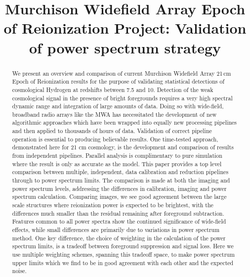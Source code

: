 \documentclass[twolcolumn,iop]{emulateapj}
\begin{document}

\title{Murchison Widefield Array Epoch of Reionization Project: Validation of power spectrum strategy}






\begin{abstract}
We present an overview and comparison of current Murchison Widefield Array 21\,cm Epoch of Reionization results for the purpose of validating statistical detections of cosmological Hydrogen at redshifts between 7.5 and 10. Detection of the weak cosmological signal in the presence of bright foregrounds requires a very high spectral dynamic range and integration of large amounts of data. Doing so with wide-field, broadband radio arrays like the MWA has necessitated the development of new algorithmic approaches which have been wrapped into equally new processing pipelines and then applied to thousands of hours of data. Validation of  correct pipeline operation is essential to producing believable results. One time-tested approach, demonstrated here for 21 cm cosmology, is the development and comparison of results from independent pipelines. Parallel analysis is complimentary to pure simulation where the result is only as accurate as the model.  This paper provides a top level comparison between multiple, independent, data calibration and reduction pipelines through to power spectrum limits.  The comparison is made at both the imaging and power spectrum levels, addressing the differences in calibration, imaging and power spectrum calculation. Comparing images, we see good agreement between the large scale structures where reionization power is expected to be brightest, with the differences much smaller than the residual remaining after foreground subtraction. Features common to all power spectra show the continued significance of wide-field effects, while small differences are primarily due to variations in power spectrum method. One key difference, the choice of weighting in the calculation of the power spectrum limits, is a tradeoff between foreground suppression and signal loss. Here we use multiple weighting schemes, spanning this tradeoff space, to make power spectrum upper limits which we find to be in good agreement with each other and the expected noise.  

\end{abstract}
\end{document}
